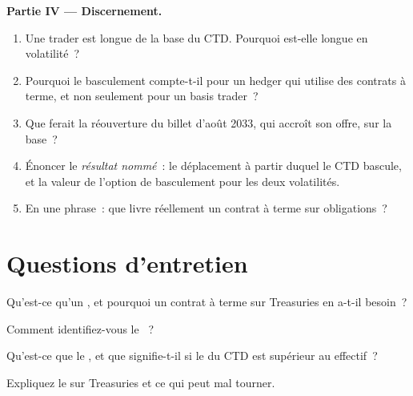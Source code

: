 \begin{problem}
\medskip\noindent\textbf{Partie IV --- Discernement.}
\begin{enumerate}[resume]
\item Une trader est longue de la base du CTD. Pourquoi est-elle longue en volatilité~?
\item Pourquoi le basculement compte-t-il pour un hedger qui utilise des contrats à terme, et non seulement pour un
basis trader~?
\item Que ferait la réouverture du billet d'août 2033, qui accroît son offre, sur
la base~?
\item Énoncer le \emph{résultat nommé}~: le déplacement à partir duquel le CTD bascule, et
la valeur de l'option de basculement pour les deux volatilités.
\item En une phrase~: que livre réellement un contrat à terme sur obligations~?
\end{enumerate}
\end{problem}

\section{Questions d'entretien}

\begin{interviewq}\label{iq:m2:bond-futures:1}
Qu'est-ce qu'un , et pourquoi un contrat à terme sur Treasuries en a-t-il besoin~?
\end{interviewq}

\begin{interviewq}\label{iq:m2:bond-futures:2}
Comment identifiez-vous le ~?
\end{interviewq}

\begin{interviewq}\label{iq:m2:bond-futures:3}
Qu'est-ce que le , et que signifie-t-il si le  du CTD
est supérieur au  effectif~?
\end{interviewq}

\begin{interviewq}\label{iq:m2:bond-futures:4}
Expliquez le  sur Treasuries et ce qui peut mal tourner.
\end{interviewq}

